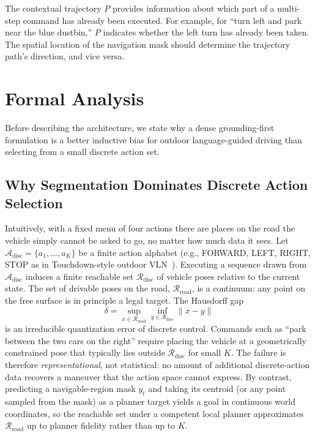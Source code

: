 The contextual trajectory $P$ provides information about which part of a multi-step command has already been executed. For example, for ``turn left and park near the blue dustbin,'' $P$ indicates whether the left turn has already been taken. The spatial location of the navigation mask should determine the trajectory path's direction, and vice versa.

\section{Formal Analysis}
\label{sec:formal_analysis}

Before describing the architecture, we state why a dense grounding-first formulation is a better inductive bias for outdoor language-guided driving than selecting from a small discrete action set.

\subsection{Why Segmentation Dominates Discrete Action Selection}

Intuitively, with a fixed menu of four actions there are places on the road the vehicle simply cannot be asked to go, no matter how much data it sees. Let $\mathcal{A}_{\mathrm{disc}}=\{a_1,\ldots,a_K\}$ be a finite action alphabet (e.g., FORWARD, LEFT, RIGHT, STOP as in Touchdown-style outdoor VLN~\cite{Chen2019TOUCHDOWN}). Executing a sequence drawn from $\mathcal{A}_{\mathrm{disc}}$ induces a finite reachable set $\mathcal{R}_{\mathrm{disc}}$ of vehicle poses relative to the current state. The set of drivable poses on the road, $\mathcal{R}_{\mathrm{road}}$, is a continuum: any point on the free surface is in principle a legal target. The Hausdorff gap
\begin{equation}
    \delta = \sup_{x \in \mathcal{R}_{\mathrm{road}}} \inf_{y \in \mathcal{R}_{\mathrm{disc}}} \|x-y\|
\end{equation}
is an irreducible quantization error of discrete control. Commands such as ``park between the two cars on the right'' require placing the vehicle at a geometrically constrained pose that typically lies outside $\mathcal{R}_{\mathrm{disc}}$ for small $K$. The failure is therefore \emph{representational}, not statistical: no amount of additional discrete-action data recovers a maneuver that the action space cannot express. By contrast, predicting a navigable-region mask $y_t$ and taking its centroid (or any point sampled from the mask) as a planner target yields a goal in continuous world coordinates, so the reachable set under a competent local planner approximates $\mathcal{R}_{\mathrm{road}}$ up to planner fidelity rather than up to $K$.

